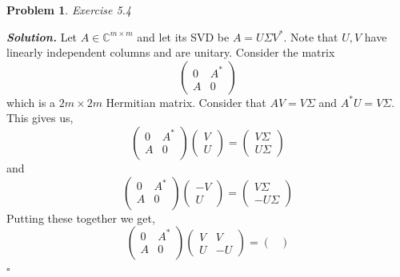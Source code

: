 \documentclass[12pt]{report}
\newtheorem{problem}{Problem}
\newenvironment{solution}[1][\it{Solution}]{\textbf{#1. } }{$\square$}
\def\C{{\mathbb C}}
\begin{document}
\newpage




\begin{problem}
    Exercise 5.4
\end{problem}

\begin{solution}
    \noindent
    Let $A \in \C^{m \times m}$ and let its SVD be $A = U \Sigma V^*$. Note that $U,V$ have linearly independent columns and are unitary. Consider the matrix $$\begin{pmatrix} 0 & A^* \\ A & 0 \end{pmatrix}$$
    which is a $2m \times 2m$ Hermitian matrix. Consider that $AV = V\Sigma$ and $A^*U=V\Sigma$. This gives us,
    $$\begin{pmatrix}
        0&A^*\\A&0\\
    \end{pmatrix}\begin{pmatrix}
        V\\U
    \end{pmatrix}=\begin{pmatrix}
        V\Sigma\\U\Sigma
    \end{pmatrix}$$
    and 
    $$\begin{pmatrix}
        0&A^*\\A&0\\
    \end{pmatrix}\begin{pmatrix}
        -V\\U
    \end{pmatrix}=\begin{pmatrix}
        V\Sigma\\-U\Sigma
    \end{pmatrix}$$
    Putting these together we get,
    $$\begin{pmatrix}
        0&A^*\\A&0\\
    \end{pmatrix}\begin{pmatrix}
        V&V\\U&-U
    \end{pmatrix}=\begin{pmatrix}

\end{pmatrix}$$
\end{solution}
\end{document}
